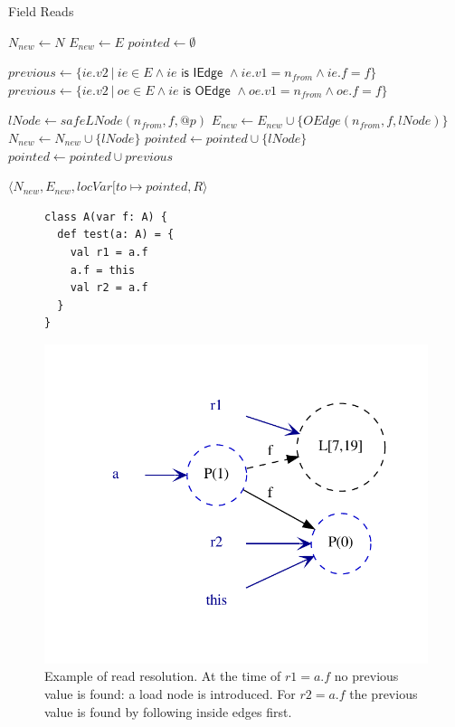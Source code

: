 \begin{algorithm}
\caption{Field Reads}\label{algo:pt:reads}
\begin{algorithmic}[1]
    \State $N_{new} \gets N$
    \State $E_{new} \gets E$
    \State $pointed \gets \emptyset$

        \State $previous \gets \{ ie.v2 ~|~ ie \in E \land ie \textsf{ is IEdge } \land ie.v1 = n_{from} \land ie.f = f \}$
            \State $previous \gets \{ ie.v2 ~|~ oe \in E \land ie \textsf{ is OEdge } \land oe.v1 = n_{from} \land oe.f = f \}$
        \EndIf

            \State $lNode \gets safeLNode(n_{from}, f, @p)$
            \State $E_{new} \gets E_{new} \cup \{ OEdge(n_{from}, f, lNode) \}$
            \State $N_{new} \gets N_{new} \cup \{ lNode \}$
            \State $pointed \gets pointed \cup \{ lNode \}$
        \Else
            \State $pointed \gets pointed \cup previous$
        \EndIf
    \EndFor

    \State \Return $\langle N_{new}, E_{new}, locVar[ to \mapsto pointed, R \rangle$
\EndFunction
\end{algorithmic}
\end{algorithm}

\begin{figure}[h]
\begin{minipage}[tl]{0.4\linewidth}
    \centering
\lstset{linewidth=0.6\linewidth}
\begin{lstlisting}
class A(var f: A) {
  def test(a: A) = {
    val r1 = a.f
    a.f = this
    val r2 = a.f
  }
}
\end{lstlisting}
\end{minipage}
\begin{minipage}[tr]{0.7\linewidth}
    \centering
    \includegraphics[scale=0.7]{images/pt_exread}
\end{minipage}
    \caption{Example of read resolution. At the time of $r1 = a.f$ no previous value is
found: a load node is introduced. For $r2 = a.f$ the previous value is found by
following inside edges first.}
    \label{fig:pt:exread}
\end{figure}
\FloatBarrier
